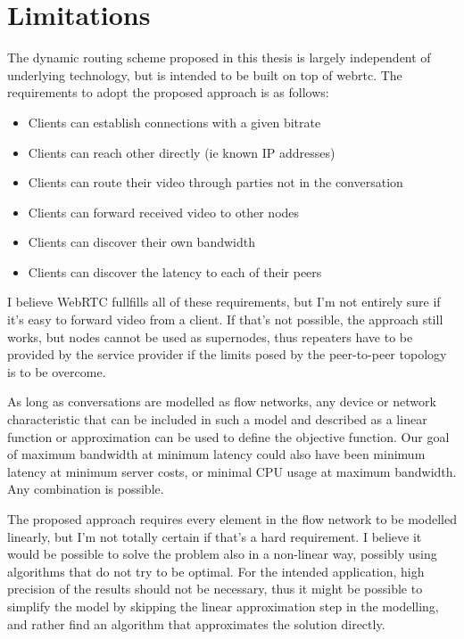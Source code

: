 \section{Limitations}

The dynamic routing scheme proposed in this thesis is largely independent of underlying technology, but is intended to be built on top of \gls{webrtc}. The requirements to adopt the proposed approach is as follows:

\begin{itemize}
    \item Clients can establish connections with a given bitrate
    \item Clients can reach other directly (ie known IP addresses)
    \item Clients can route their video through parties not in the conversation
    \item Clients can forward received video to other nodes
    \item Clients can discover their own bandwidth
    \item Clients can discover the latency to each of their peers
\end{itemize}

I believe WebRTC fullfills all of these requirements, but I'm not entirely sure if it's easy to forward video from a client. If that's not possible, the approach still works, but nodes cannot be used as supernodes, thus repeaters have to be provided by the service provider if the limits posed by the peer-to-peer topology is to be overcome.

As long as conversations are modelled as flow networks, any device or network characteristic that can be included in such a model and described as a linear function or approximation can be used to define the objective function. Our goal of maximum bandwidth at minimum latency could also have been minimum latency at minimum server costs, or minimal CPU usage at maximum bandwidth. Any combination is possible.

The proposed approach requires every element in the flow network to be modelled linearly, but I'm not totally certain if that's a hard requirement. I believe it would be possible to solve the problem also in a non-linear way, possibly using algorithms that do not try to be optimal. For the intended application, high precision of the results should not be necessary, thus it might be possible to simplify the model by skipping the linear approximation step in the modelling, and rather find an algorithm that approximates the solution directly.


